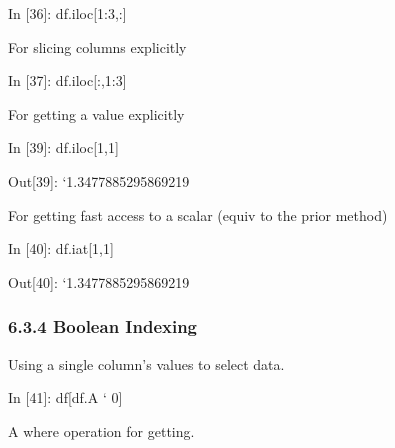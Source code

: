 \documentclass[letterpaper,10pt,english]{sphinxmanual}
\def\PYGZgt{\char`\>}
\def\PYGZhy{\char`\-}
\begin{document}
\begin{OriginalVerbatim}[commandchars=\\\{\}]
\textcolor{nbsphinxin}{In [36]: }df.iloc[1:3,:]
\end{OriginalVerbatim}

For slicing columns explicitly

\begin{OriginalVerbatim}[commandchars=\\\{\}]
\textcolor{nbsphinxin}{In [37]: }df.iloc[:,1:3]
\end{OriginalVerbatim}

For getting a value explicitly

\begin{OriginalVerbatim}[commandchars=\\\{\}]
\textcolor{nbsphinxin}{In [39]: }df.iloc[1,1]
\end{OriginalVerbatim}

\begin{OriginalVerbatim}[commandchars=\\\{\}]
\textcolor{nbsphinxout}{Out[39]: }\PYGZhy{}1.3477885295869219
\end{OriginalVerbatim}

For getting fast access to a scalar (equiv to the prior method)

\begin{OriginalVerbatim}[commandchars=\\\{\}]
\textcolor{nbsphinxin}{In [40]: }df.iat[1,1]
\end{OriginalVerbatim}

\begin{OriginalVerbatim}[commandchars=\\\{\}]
\textcolor{nbsphinxout}{Out[40]: }\PYGZhy{}1.3477885295869219
\end{OriginalVerbatim}


\subsubsection{6.3.4 Boolean Indexing}
\label{pandas_quickstart:6.3.4-Boolean-Indexing}
Using a single column’s values to select data.

\begin{OriginalVerbatim}[commandchars=\\\{\}]
\textcolor{nbsphinxin}{In [41]: }df[df.A \PYGZgt{} 0]
\end{OriginalVerbatim}

A where operation for getting.
\end{document}
